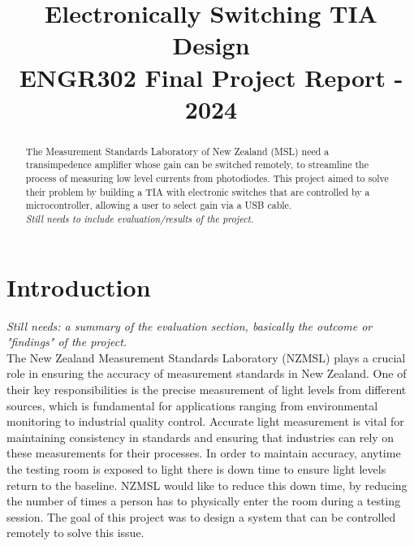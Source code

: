 \documentclass[conference]{IEEEtran}
\title{Electronically Switching TIA Design \\
    \large ENGR302 Final Project Report - 2024}
\author{
    \IEEEauthorblockN{Evgeny Zhilkin, Louis Smith, Mario Pankusz, Max Mawby}
    \IEEEauthorblockA{
        Electrical \& Electronics Engineering \\
        Te Herenga Waka - Victoria University of Wellington \\
        Wellington, Aotearoa New Zealand \\
    }
}
\begin{document}
\maketitle

\begin{abstract}

The Measurement Standards Laboratory of New Zealand (MSL) need a transimpedence amplifier whose gain can be switched remotely, to streamline the process of measuring low level currents from photodiodes. This project aimed to solve their problem by building a TIA with electronic switches that are controlled by a microcontroller, allowing a user to select gain via a USB cable. \\
\textit{Still needs to include evaluation/results of the project.}\\

\end{abstract}

\section{Introduction}

\textit{Still needs: a summary of the evaluation section, basically the outcome or "findings" of the project.} \\

The New Zealand Measurement Standards Laboratory (NZMSL) plays a crucial role in ensuring the accuracy of measurement standards in New Zealand. One of their key responsibilities is the precise measurement of light levels from different sources, which is fundamental for applications ranging from environmental monitoring to industrial quality control. Accurate light measurement is vital for maintaining consistency in standards and ensuring that industries can rely on these measurements for their processes. In order to maintain accuracy, anytime the testing room is exposed to light there is down time to ensure light levels return to the baseline. NZMSL would like to reduce this down time, by reducing the number of times a person has to physically enter the room during a testing session. The goal of this project was to design a system that can be controlled remotely to solve this issue. \\
\end{document}
